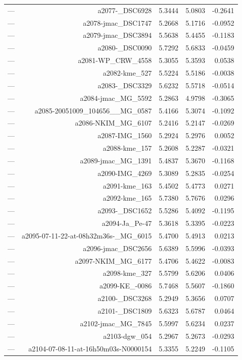\begin{table}[htbp]
\begin{tabular}{lrrrr}
— & a2077-_DSC6928 & 5.3444 & 5.0803 & -0.2641 \\
— & a2078-jmac_DSC1747 & 5.2668 & 5.1716 & -0.0952 \\
— & a2079-jmac_DSC3894 & 5.5638 & 5.4455 & -0.1183 \\
— & a2080-_DSC0090 & 5.7292 & 5.6833 & -0.0459 \\
— & a2081-WP_CRW_4558 & 5.3055 & 5.3593 & 0.0538 \\
— & a2082-kme_527 & 5.5224 & 5.5186 & -0.0038 \\
— & a2083-_DSC3329 & 5.6232 & 5.5718 & -0.0514 \\
— & a2084-jmac_MG_5592 & 5.2863 & 4.9798 & -0.3065 \\
— & a2085-20051009_104656__MG_0587 & 5.4166 & 5.3074 & -0.1092 \\
— & a2086-NKIM_MG_6107 & 5.2416 & 5.2147 & -0.0269 \\
— & a2087-IMG_1560 & 5.2924 & 5.2976 & 0.0052 \\
— & a2088-kme_157 & 5.2608 & 5.2287 & -0.0321 \\
— & a2089-jmac_MG_1391 & 5.4837 & 5.3670 & -0.1168 \\
— & a2090-IMG_4269 & 5.3089 & 5.2835 & -0.0254 \\
— & a2091-kme_163 & 5.4502 & 5.4773 & 0.0271 \\
— & a2092-kme_165 & 5.7380 & 5.7676 & 0.0296 \\
— & a2093-_DSC1652 & 5.5286 & 5.4092 & -0.1195 \\
— & a2094-Ja_Pe-47 & 5.3618 & 5.3395 & -0.0223 \\
— & a2095-07-11-22-at-08h32m36s-_MG_6015 & 5.4700 & 5.4913 & 0.0213 \\
— & a2096-jmac_DSC2656 & 5.6389 & 5.5996 & -0.0393 \\
— & a2097-NKIM_MG_6177 & 5.4706 & 5.4622 & -0.0083 \\
— & a2098-kme_327 & 5.5799 & 5.6206 & 0.0406 \\
— & a2099-KE_-0086 & 5.7468 & 5.5607 & -0.1860 \\
— & a2100-_DSC3268 & 5.2949 & 5.3656 & 0.0707 \\
— & a2101-_DSC1809 & 5.6323 & 5.6787 & 0.0464 \\
— & a2102-jmac_MG_7845 & 5.5997 & 5.6234 & 0.0237 \\
— & a2103-dgw_054 & 5.2967 & 5.2673 & -0.0293 \\
— & a2104-07-08-11-at-16h50m03s-N0000154 & 5.3355 & 5.2249 & -0.1105 \\

\end{tabular}
\end{table}
